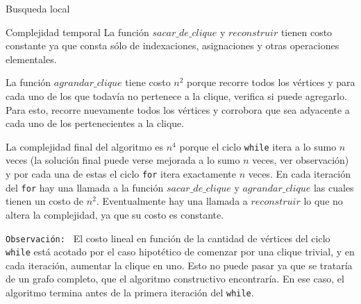 \begin{section}{Busqueda local}
\begin{subsection}{Complejidad temporal}
			La función $sacar\_de\_clique$ y $reconstruir$ tienen costo constante ya que consta sólo de indexaciones, asignaciones y otras operaciones elementales.

			La función $agrandar\_clique$ tiene costo $n^2$ porque recorre todos los vértices y para cada uno de los que todavía no pertenece a la clique, verifica si puede agregarlo. Para esto, recorre nuevamente todos los vértices y corrobora que sea adyacente a cada uno de los pertenecientes a la clique.

			La complejidad final del algoritmo es $n^4$ porque el ciclo \texttt{while} itera a lo sumo $n$ veces (la solución final puede verse mejorada a lo sumo $n$ veces, ver observación) y por cada una de estas el ciclo \texttt{for} itera exactamente $n$ veces. En cada iteración del \texttt{for} hay una llamada a la función $sacar\_de\_clique$ y $agrandar\_clique$ las cuales tienen un costo de $n^2$. Eventualmente hay una llamada a $reconstruir$ lo que no altera la complejidad, ya que su costo es constante.
			
			\texttt{Observación: } El costo lineal en función de la cantidad de vértices del ciclo \texttt{while} está acotado por el caso hipotético de comenzar por una clique trivial, y en cada iteración, aumentar la clique en uno. Esto no puede pasar ya que se trataría de un grafo completo, que el algoritmo constructivo encontraría. En ese caso, el algoritmo termina antes de la primera iteración del \texttt{while}.
		\end{subsection}
\end{section}



